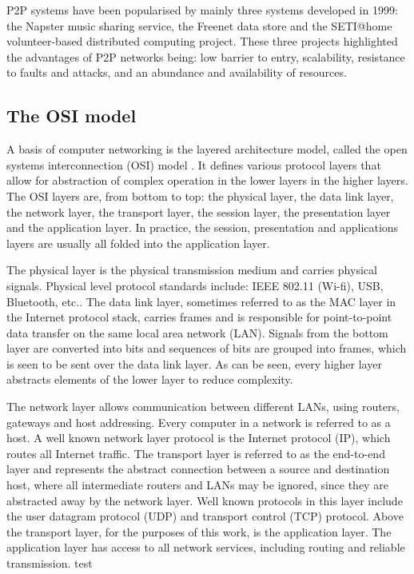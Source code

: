 P2P systems have been popularised by mainly three systems developed in 1999: the Napster music sharing service, the Freenet data store and the SETI@home volunteer-based distributed computing project. These three projects highlighted the advantages of P2P networks being: low barrier to entry, scalability, resistance to faults and attacks, and an abundance and availability of resources.

\subsection{The OSI model}

A basis of computer networking is the layered architecture model, called the open systems interconnection (OSI) model \cite{OSI_protocol_stack}. It defines various protocol layers that allow for abstraction of complex operation in the lower layers in the higher layers. The OSI layers are, from bottom to top: the physical layer, the data link layer, the network layer, the transport layer, the session layer, the presentation layer and the application layer. In practice, the session, presentation and applications layers are usually all folded into the application layer.

The physical layer is the physical transmission medium and carries physical signals. Physical level protocol standards include: IEEE 802.11 (Wi-fi), USB, Bluetooth, etc.. The data link layer, sometimes referred to as the MAC layer in the Internet protocol stack, carries frames and is responsible for point-to-point data transfer on the same local area network (LAN). Signals from the bottom layer are converted into bits and sequences of bits are grouped into frames, which is seen to be sent over the data link layer. As can be seen, every higher layer abstracts elements of the lower layer to reduce complexity.

The network layer allows communication between different LANs, using routers, gateways and host addressing. Every computer in a network is referred to as a host. A well known network layer protocol is the Internet protocol (IP), which routes all Internet traffic. The transport layer is referred to as the end-to-end layer and represents the abstract connection between a source and destination host, where all intermediate routers and LANs may be ignored, since they are abstracted away by the network layer. Well known protocols in this layer include the user datagram protocol (UDP) and transport control (TCP) protocol. Above the transport layer, for the purposes of this work, is the application layer. The application layer has access to all network services, including routing and reliable transmission. test

